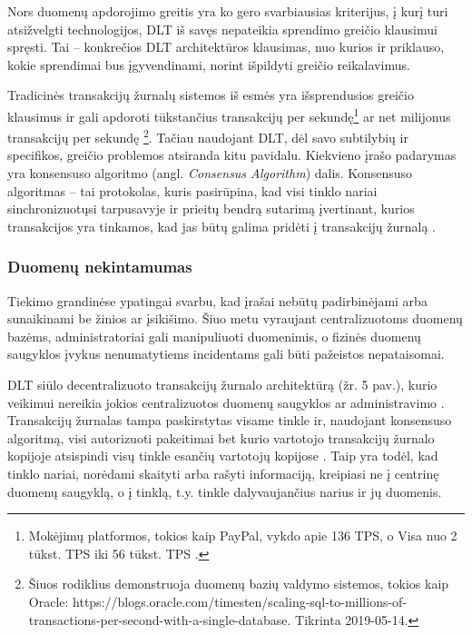 Nors duomenų apdorojimo greitis yra ko gero svarbiausias kriterijus, į kurį turi atsižvelgti technologijos, DLT iš savęs nepateikia sprendimo greičio klausimui spręsti. Tai – konkrečios DLT architektūros klausimas, nuo kurios ir priklauso, kokie sprendimai bus įgyvendinami, norint išpildyti greičio reikalavimus.

Tradicinės transakcijų žurnalų sistemos iš esmės yra išsprendusios greičio klausimus ir gali apdoroti tūkstančius transakcijų per sekundę\footnote{Mokėjimų platformos, tokios kaip PayPal, vykdo apie 136 TPS, o Visa nuo 2 tūkst. TPS iki 56 tūkst. TPS \cite{herrera2016privacy}.} ar net milijonus transakcijų per sekundę \footnote{Šiuos rodiklius demonstruoja duomenų bazių valdymo sistemos, tokios kaip Oracle: https://blogs.oracle.com/timesten/scaling-sql-to-millions-of-transactions-per-second-with-a-single-database. Tikrinta 2019-05-14.}. Tačiau naudojant DLT, dėl savo subtilybių ir specifikos, greičio problemos atsiranda kitu pavidalu. Kiekvieno įrašo padarymas yra konsensuso algoritmo (angl. \textit{Consensus Algorithm}) dalis. Konsensuso algoritmas – tai protokolas, kuris pasirūpina, kad visi tinklo nariai sinchronizuotųsi tarpusavyje ir prieitų bendrą sutarimą įvertinant, kurios transakcijos yra tinkamos, kad jas būtų galima pridėti į transakcijų žurnalą \cite{cachin2017blockchain}. 




\subsubsection{Duomenų nekintamumas}

Tiekimo grandinėse ypatingai svarbu, kad įrašai nebūtų padirbinėjami arba sunaikinami be žinios ar įsikišimo. Šiuo metu vyraujant centralizuotoms duomenų bazėms, administratoriai gali manipuliuoti duomenimis, o fizinės duomenų saugyklos įvykus nenumatytiems incidentams gali būti pažeistos nepataisomai.

DLT siūlo decentralizuoto transakcijų žurnalo architektūrą (žr. 5 pav.), kurio veikimui nereikia jokios centralizuotos duomenų saugyklos ar administravimo \cite{yu2018virtualization}. Transakcijų žurnalas tampa paskirstytas visame tinkle ir, naudojant konsensuso algoritmą, visi autorizuoti pakeitimai bet kurio vartotojo transakcijų žurnalo kopijoje atsispindi visų tinkle esančių vartotojų kopijose \cite{puthal2018blockchain}. Taip yra todėl, kad tinklo nariai, norėdami skaityti arba rašyti informaciją, kreipiasi ne į centrinę duomenų saugyklą, o į tinklą, t.y. tinkle dalyvaujančius narius ir jų duomenis.


